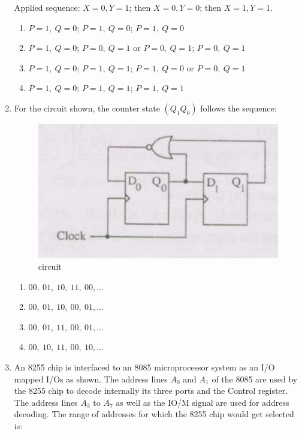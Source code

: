 \documentclass[journal,12pt,onecolumn]{IEEEtran}
\theoremstyle{remark}
\begin{document}
\begin{enumerate}
 Applied sequence: $X=0,Y=1$; then $X=0,Y=0$; then $X=1,Y=1$.
\hfill{}
\begin{enumerate}
  \item $P=1,\ Q=0$; \quad $P=1,\ Q=0$; \quad $P=1,\ Q=0$
  \item $P=1,\ Q=0$; \quad $P=0,\ Q=1$ or $P=0,\ Q=1$; \quad $P=0,\ Q=1$
  \item $P=1,\ Q=0$; \quad $P=1,\ Q=1$; \quad $P=1,\ Q=0$ or $P=0,\ Q=1$
  \item $P=1,\ Q=0$; \quad $P=1,\ Q=1$; \quad $P=1,\ Q=1$
\end{enumerate}

\item For the circuit shown, the counter state $(Q_1 Q_0)$ follows the sequence:

\begin{figure}[H]
    \centering
    \includegraphics[width=0.4\linewidth]{Q45.jpg}
    \caption{circuit}
    \label{fig:full_wave}
\end{figure}

\hfill{}
\begin{enumerate}
  \item $00,\ 01,\ 10,\ 11,\ 00,\dots$
  \item $00,\ 01,\ 10,\ 00,\ 01,\dots$
  \item $00,\ 01,\ 11,\ 00,\ 01,\dots$
  \item $00,\ 10,\ 11,\ 00,\ 10,\dots$
\end{enumerate}

\item An 8255 chip is interfaced to an 8085 microprocessor system as an I/O mapped I/Os as shown. The address lines $A_0$ and $A_1$ of the 8085 are used by the 8255 chip to decode internally its three ports and the Control register. The address lines $A_3$ to $A_7$ as well as the IO/M signal are used for address decoding. The range of addresses for which the 8255 chip would get selected is: 


\end{enumerate}
\end{document}

